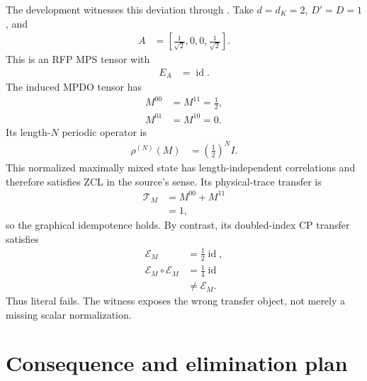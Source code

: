 \documentclass{article}
\begin{document}
The development witnesses this deviation through
. Take
$d=d_K=2$, $D'=D=1$, and
\begin{align}
    A
    &=\left[\tfrac{1}{\sqrt2},0,0,\tfrac{1}{\sqrt2}\right].
    \label{eq:zcl_purification_tensor}
\end{align}
This is an RFP MPS tensor with
\begin{align}
    E_A
    &=\operatorname{id}.
    \label{eq:zcl_purification_transfer_identity}
\end{align}
The induced MPDO tensor has
\begin{align}
    M^{00}
    &=M^{11}
    =\tfrac12,
    \label{eq:zcl_mixed_diagonal_entries}\\
    M^{01}
    &=M^{10}
    =0.
    \label{eq:zcl_mixed_offdiagonal_entries}
\end{align}
Its length-$N$ periodic operator is
\begin{align}
    \rho^{(N)}(M)
    &=\left(\tfrac12\right)^N I.
    \label{eq:zcl_maximally_mixed_family}
\end{align}
This normalized maximally mixed state has length-independent correlations and
therefore satisfies ZCL in the source's sense. Its physical-trace transfer is
\begin{align}
    \mathcal T_M
    &=M^{00}+M^{11}
    \label{eq:zcl_maximally_mixed_trace_sum}\\
    &=1,
    \label{eq:zcl_maximally_mixed_trace_identity}
\end{align}
so the graphical idempotence holds. By contrast, its doubled-index CP transfer
satisfies
\begin{align}
    \mathcal E_M
    &=\tfrac12\operatorname{id},
    \label{eq:zcl_maximally_mixed_doubled_transfer}\\
    \mathcal E_M\circ\mathcal E_M
    &=\tfrac14\operatorname{id}
    \label{eq:zcl_maximally_mixed_doubled_square}\\
    &\ne\mathcal E_M.
    \label{eq:zcl_maximally_mixed_doubled_failure}
\end{align}
Thus literal  fails. The witness exposes the wrong
transfer object, not merely a missing scalar normalization.

\section{Consequence and elimination plan}
\end{document}
